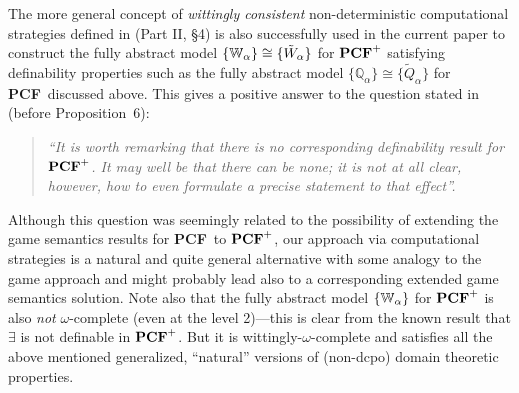 \documentclass[fleqn]{LMCS}
\theoremstyle{plain}\newtheorem{satz}[thm]{Satz}
\theoremstyle{plain}\newtheorem{hyp}[thm]{Hypothesis}
\theoremstyle{plain}\newtheorem{hyps}[thm]{Hypotheses}
\theoremstyle{definition}\newtheorem{note}[thm]{Note}
\newcommand{\setof}[1]{\{#1\}}
\newcommand{\bbQ}{\mathbb{Q}}
\newcommand{\PCF}{\mbox{\bf PCF}}
\newcommand{\tQ}{\tilde{Q}}
\newcommand{\tW}{\tilde{W}}
\newcommand{\?}{\mbox{?}}
\begin{document}
The more general concept of \emph{wittingly consistent} 
non-deterministic computational 
stra\-tegies defined in 
\cite{Saz76t} (Part II, \S 4) is also successfully used in the current 
paper to 
construct the fully abstract model $\setof{\bbW_\alpha}\cong\setof{\tW_\alpha}$ 
for $\PCF^+$ satisfying  
definability properties such as  
the fully abstract model $\setof{\bbQ_\alpha}\cong\setof{\tQ_\alpha}$ 
for \PCF\ discussed above. 
This gives a positive answer to the question 
stated in \cite{Longley-Plotkin} 
(before Proposition~6): 
\begin{quote}
\emph{``It is worth remarking that 
there is no corresponding definability result for $\PCF^+$. 
It may well be that there can be none; it is not at all clear, however, 
how to even formulate a precise statement to that effect''.}
\end{quote}
Although this question was seemingly related to the possibility 
of extending the game semantics results for \PCF\ to $\PCF^+$, 
our approach via computational 
strategies is a natural and quite general alternative 
with some analogy to the game approach and might probably 
lead also to a corresponding extended game semantics solution. 
Note also that the fully abstract model $\setof{\bbW_\alpha}$ 
for $\PCF^+$ is also 
\emph{not} $\omega$-complete (even at the level 2)---this is clear from the known 
result that $\exists$ is not definable in $\PCF^+$. 
But it is wittingly-$\omega$-complete 
and satisfies all the above mentioned generalized, ``natural'' 
versions of (non-dcpo) domain theoretic properties. 
\end{document}
